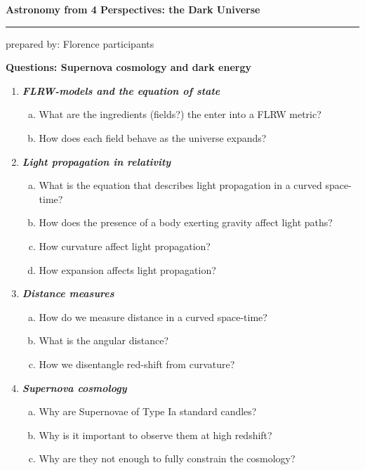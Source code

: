 \documentclass[a4paper,12pt]{article}
\newcommand{\question}[1]{\textbf{\textit{#1}}}
\newcommand{\HRule}{\rule{\linewidth}{0.3mm}}
\begin{document}
\pagestyle{empty}


\begin{center}
\LARGE \textbf{Astronomy from 4 Perspectives: the Dark Universe}
\HRule
\end{center}
\begin{flushright}
prepared by: Florence participants
\end{flushright}
\begin{center}
{\Large \textbf{Questions: Supernova cosmology and dark energy}}
\end{center}
\vspace{5mm}

\begin{enumerate}

\item \question{FLRW-models and the equation of state}\\
\begin{enumerate}[(a)]
\item{What are the ingredients (fields?) the enter into a FLRW
    metric?}
\item{How does each field behave as the universe expands?}
\end{enumerate}

\item \question{Light propagation in relativity}\\
\begin{enumerate}[(a)]
\item{What is the equation that describes light propagation in a
    curved space-time?}
\item{How does the presence of a body exerting gravity affect light
    paths?}
\item{How curvature affect light propagation?}
\item{How expansion affects light propagation?}
\end{enumerate}

\item \question{Distance measures}\\
\begin{enumerate}[(a)]
\item{How do we measure distance in a curved space-time?}
\item{What is the angular distance?}
\item{How we disentangle red-shift from curvature?}
\end{enumerate}

\item \question{Supernova cosmology}\\
\begin{enumerate}[(a)]
\item{Why are Supernovae of Type Ia standard candles?}
\item{Why is it important to observe them at high redshift?}
\item{Why are they not enough to fully constrain the cosmology?}
\end{enumerate}


\end{enumerate}
\end{document}
